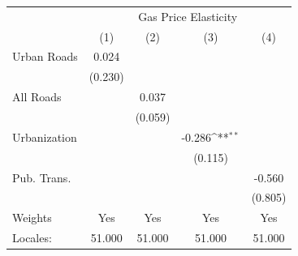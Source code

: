 {
\def\sym#1{\ifmmode^{#1}\else\(^{#1}\)\fi}
\begin{tabular}{l*{4}{c}}
\hline\hline
            &\multicolumn{4}{c}{Gas Price Elasticity}                                               \\
            &\multicolumn{1}{c}{(1)}         &\multicolumn{1}{c}{(2)}         &\multicolumn{1}{c}{(3)}         &\multicolumn{1}{c}{(4)}         \\
\hline
Urban Roads &       0.024         &                     &                     &                     \\
            &     (0.230)         &                     &                     &                     \\
[1em]
All Roads   &                     &       0.037         &                     &                     \\
            &                     &     (0.059)         &                     &                     \\
[1em]
Urbanization&                     &                     &      -0.286\sym{**}&                     \\
            &                     &                     &     (0.115)         &                     \\
[1em]
Pub. Trans. &                     &                     &                     &      -0.560         \\
            &                     &                     &                     &     (0.805)         \\
\hline
Weights     &         Yes         &         Yes         &         Yes         &         Yes         \\
Locales:    &      51.000         &      51.000         &      51.000         &      51.000         \\
\hline\hline
\end{tabular}
}
